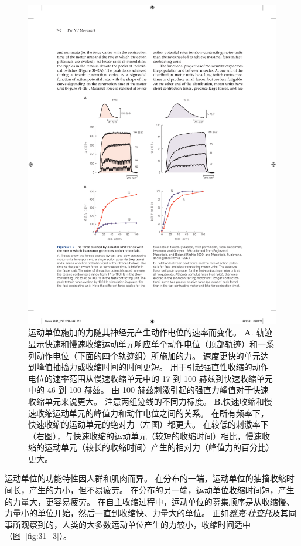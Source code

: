 \begin{figure}[htbp]
	\centering
	\includegraphics[width=0.87\linewidth]{chap31/fig_31_2}
	\caption{运动单位施加的力随其神经元产生动作电位的速率而变化。
		\textbf{A}. 轨迹显示快速和慢速收缩运动单元响应单个动作电位（顶部轨迹）和一系列动作电位（下面的四个轨迹组）所施加的力。
	速度更快的单元达到峰值抽搐力或收缩时间的时间更短。
	用于引起强直性收缩的动作电位的速率范围从慢速收缩单元中的 17 到 100 赫兹到快速收缩单元中的 46 到 100 赫兹。
	由 100 赫兹刺激引起的强直力峰值对于快速收缩单元来说更大。
	注意两组迹线的不同力标度\cite{botterman1986gradation,fuglevand1999force,macefield1996contractile}。
	\textbf{B}.快速收缩和慢速收缩运动单元的峰值力和动作电位之间的关系。
	在所有频率下，快速收缩的运动单元的绝对力（左图）都更大。
	在较低的刺激率下（右图），与快速收缩的运动单元（较短的收缩时间）相比，慢速收缩的运动单元（较长的收缩时间）产生的相对力（峰值力的百分比）更大。}
	\label{fig:31_2}
\end{figure}


运动单位的功能特性因人群和肌肉而异。
在分布的一端，运动单位的抽搐收缩时间长，产生的力小，但不易疲劳。
在分布的另一端，运动单位收缩时间短，产生的力量大，更容易疲劳。
在自主收缩过程中，运动单位的募集顺序是从收缩慢、力量小的单位开始，然后一直到收缩快、力量大的单位。 
正如\textit{雅克$\cdot$杜查托}及其同事所观察到的，人类的大多数运动单位产生的力较小，收缩时间适中（图~\ref{fig:31_3}）。


